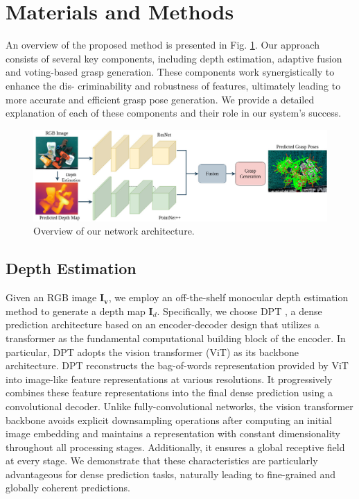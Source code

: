 \section{Materials and Methods}
\label{sec:methodology}

An overview of the proposed method is presented in Fig. \ref{fig:Overview}. Our approach consists of several key components, including depth estimation, adaptive fusion and voting-based grasp generation. These components work synergistically to enhance the dis- criminability and robustness of features, ultimately leading to more accurate and efficient grasp pose generation. We provide a detailed explanation of each of these components and their role in our system’s success.


\begin{figure}[h!]
	\centering
	\includegraphics[width=0.98\linewidth]{figs/overview}
	\caption{Overview of our network architecture.}
	\label{fig:Overview}
\end{figure}

\subsection{Depth Estimation}

Given an RGB image $\mathbf{I_v}$, we employ an off-the-shelf monocular depth estimation method to generate a depth map $\mathbf{I}_{d}$. Specifically, we choose DPT \cite{ranftl2021vision}, a dense prediction architecture based on an encoder-decoder design that utilizes a transformer as the fundamental computational building block of the encoder. In particular, DPT adopts the vision transformer (ViT) \cite{dosovitskiy2020image} as its backbone architecture. DPT reconstructs the bag-of-words representation provided by ViT into image-like feature representations at various resolutions. It progressively combines these feature representations into the final dense prediction using a convolutional decoder. Unlike fully-convolutional networks, the vision transformer backbone avoids explicit downsampling operations after computing an initial image embedding and maintains a representation with constant dimensionality throughout all processing stages. Additionally, it ensures a global receptive field at every stage. We demonstrate that these characteristics are particularly advantageous for dense prediction tasks, naturally leading to fine-grained and globally coherent predictions.

